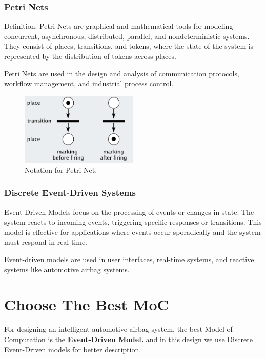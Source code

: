 \documentclass[12pt	]{article}
\begin{document}
\subsubsection{Petri Nets}
Definition: Petri Nets are graphical and mathematical tools for modeling concurrent, asynchronous, distributed, parallel, and nondeterministic systems. They consist of places, transitions, and tokens, where the state of the system is represented by the distribution of tokens across places.

Petri Nets are used in the design and analysis of communication protocols, workflow management, and industrial process control.

\begin{figure}[h]
	\centering
	\includegraphics[width=0.5\textwidth]{Images/img5.png}
	\caption{Notation for Petri Net.}
	\label{fig:Notation for Petri Net}
\end{figure}









\subsubsection{Discrete Event-Driven Systems}
Event-Driven Models focus on the processing of events or changes in state. The system reacts to incoming events, triggering specific responses or transitions. This model is effective for applications where events occur sporadically and the system must respond in real-time.

Event-driven models are used in user interfaces, real-time systems, and reactive systems like automotive airbag systems.





\section{Choose The Best MoC}
For designing an intelligent automotive airbag system, the best Model of Computation is the \textbf{Event-Driven Model.} and in this design we use Discrete Event-Driven models for better description.
\end{document}
